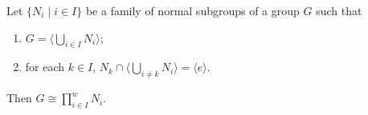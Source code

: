 \begin{theorem}
Let $\{N_i \mid i \in I\}$ be a family of normal subgroups of a group $G$ such that
\begin{enumerate}
    \item[(i)] $G = \langle \bigcup_{i \in I} N_i \rangle$;
    \item[(ii)] for each $k \in I$, $N_k \cap \langle \bigcup_{i \neq k} N_i \rangle = \langle e \rangle$.
\end{enumerate}
Then $G \cong \prod_{i \in I}^w N_i$.
\end{theorem}
